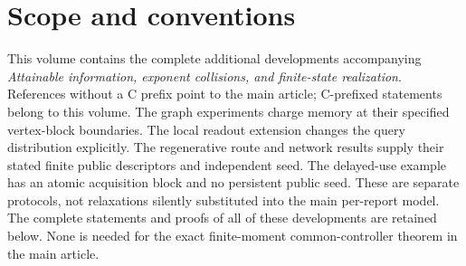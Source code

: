 \section*{Scope and conventions}
This volume contains the complete additional developments accompanying
\emph{Attainable information, exponent collisions, and finite-state
realization}. References without a C prefix point to the main article;
C-prefixed statements belong to this volume. The graph experiments
charge memory at their specified vertex-block boundaries. The local
readout extension changes the query distribution explicitly. The
regenerative route and network results supply their stated finite public
descriptors and independent seed. The delayed-use example has an atomic
acquisition block and no persistent public seed. These are separate
protocols, not relaxations silently substituted into the main per-report
model. The complete statements and proofs of all of these developments
are retained below. None is needed for the exact finite-moment
common-controller theorem in the main article.
